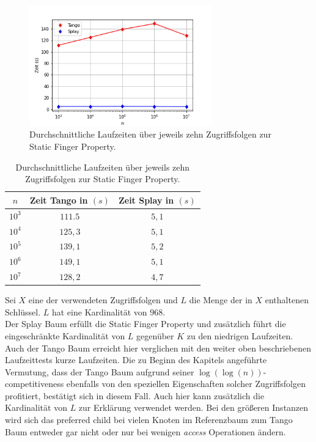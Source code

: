 \documentclass[a4paper,12pt]{article}
\begin{document}
\begin{figure}[H]
	\centering
	\includegraphics[width=0.7\textwidth]{Medien/laufzeittest/diagramm/staticfinger3}
	\caption{Durchschnittliche Laufzeiten über jeweils zehn Zugriffsfolgen zur Static Finger Property.}
\end{figure}
\begin{table}[H]
	\begin{center}
		\begin{tabular}[c]{|c|c|c|}
			\hline
		$n$ & Zeit Tango in $\left(s\right)$ &Zeit Splay in $\left(s\right)$ \\
		\hline
		$10^3$ & $111.5$ &$5,1$ \\
		\hline
		$10^4$  & $125,3$ &$5,1$  \\
		\hline
		$10^5$  & $139,1$ &  $5,2$  \\
		\hline
		$10^6$  & $149,1$ &$5,1$  \\
		\hline
		$10^7$  & $128,2$ &$4,7$  \\
		\hline
		\end{tabular}
		\caption{Durchschnittliche Laufzeiten über jeweils zehn Zugriffsfolgen zur Static Finger Property.} 
	\end{center}
\end{table}
\noindent Sei $X$ eine der verwendeten Zugriffsfolgen und $L$ die Menge der in $X$ enthaltenen Schlüssel. $L$ hat eine Kardinalität von $968$. \\
Der Splay Baum erfüllt die Static Finger Property und zusätzlich führt die eingeschränkte Kardinalität von  $L$ gegenüber $K$ zu den niedrigen Laufzeiten.     
Auch der Tango Baum erreicht hier verglichen mit den weiter oben beschriebenen Laufzeittests kurze Laufzeiten. Die zu Beginn des Kapitels angeführte Vermutung, dass der Tango Baum aufgrund seiner $\log\left(\log\left(n\right)\right)$-competitiveness ebenfalls von den speziellen Eigenschaften solcher Zugriffsfolgen profitiert, bestätigt sich in diesem Fall. Auch hier kann zusätzlich die Kardinalität von $L$ zur Erklärung verwendet werden. Bei den größeren Instanzen wird sich das preferred child bei vielen Knoten im Referenzbaum zum Tango Baum entweder gar nicht oder nur bei wenigen \textit{access} Operationen ändern. \\
\end{document}
